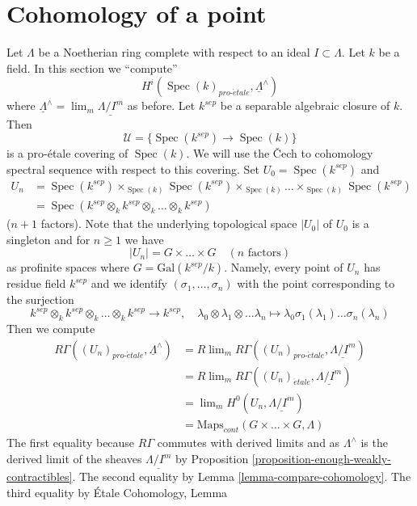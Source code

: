 \documentclass{stacks-project}
\theoremstyle{plain}
\theoremstyle{definition}
\theoremstyle{remark}
\numberwithin{equation}{subsection}
\def\lim{\mathop{\mathrm{lim}}\nolimits}
\def\Spec{\mathop{\mathrm{Spec}}}
\def\proetale{{pro\text{-}\acute{e}tale}}
\def\etale{{\acute{e}tale}}
\begin{document}
\section{Cohomology of a point}
\label{section-cohomology-point}

\noindent
Let $\Lambda$ be a Noetherian ring complete with respect to an ideal
$I \subset \Lambda$. Let $k$ be a field. In this section we ``compute''
$$
H^i(\Spec(k)_\proetale, \underline{\Lambda}^\wedge)
$$
where $\underline{\Lambda}^\wedge = \lim_m \underline{\Lambda/I^m}$ as before.
Let $k^{sep}$ be a separable algebraic closure of $k$.
Then
$$
\mathcal{U} = \{\Spec(k^{sep}) \to \Spec(k)\}
$$
is a pro-\'etale covering of $\Spec(k)$. We will use the {\v C}ech
to cohomology spectral sequence with respect to this covering.
Set $U_0 = \Spec(k^{sep})$ and
\begin{align*}
U_n & =
\Spec(k^{sep}) \times_{\Spec(k)}
\Spec(k^{sep}) \times_{\Spec(k)} \ldots
\times_{\Spec(k)} \Spec(k^{sep}) \\
& =
\Spec(k^{sep} \otimes_k k^{sep} \otimes_k \ldots \otimes_k k^{sep})
\end{align*}
($n + 1$ factors). Note that the underlying topological space
$|U_0|$ of $U_0$ is a singleton and for $n \geq 1$ we have
$$
|U_n| = G \times \ldots \times G\quad (n\text{ factors})
$$
as profinite spaces where $G = \text{Gal}(k^{sep}/k)$. Namely, every
point of $U_n$ has residue field $k^{sep}$ and we identify
$(\sigma_1, \ldots, \sigma_n)$ with the point corresponding to the
surjection
$$
k^{sep} \otimes_k k^{sep} \otimes_k \ldots \otimes_k k^{sep}
\longrightarrow k^{sep}, \quad
\lambda_0 \otimes \lambda_1 \otimes \ldots \lambda_n
\longmapsto \lambda_0 \sigma_1(\lambda_1) \ldots \sigma_n(\lambda_n)
$$
Then we compute
\begin{align*}
R\Gamma((U_n)_\proetale, \underline{\Lambda}^\wedge)
& =
R\lim_m R\Gamma((U_n)_\proetale, \underline{\Lambda/I^m}) \\
& =
R\lim_m R\Gamma((U_n)_\etale, \underline{\Lambda/I^m}) \\
& =
\lim_m H^0(U_n, \underline{\Lambda/I^m}) \\
& = 
\text{Maps}_{cont}(G \times \ldots \times G, \Lambda)
\end{align*}
The first equality because $R\Gamma$ commutes with derived limits
and as $\Lambda^\wedge$ is the derived limit of the sheaves
$\underline{\Lambda/I^m}$ by
Proposition \ref{proposition-enough-weakly-contractibles}.
The second equality by Lemma \ref{lemma-compare-cohomology}.
The third equality by \'Etale Cohomology, Lemma
\end{document}
